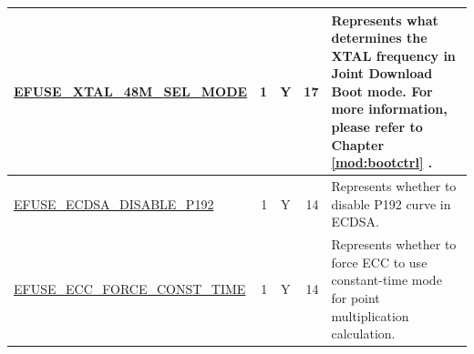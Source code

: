 \begin{longtable}[l]{ |m{8.2cm}|r|c|r|m{9cm}| }
    \hline
    \hyperref[fielddesc:EFUSEXTAL48MSELMODE]{EFUSE\_XTAL\_48M\_SEL\_MODE} &  1 & Y & 17 & Represents what determines the XTAL frequency in \textbf{Joint Download Boot} mode.  For more information, please refer to Chapter \ref{mod:bootctrl} \textit{\nameref{mod:bootctrl}}.\\
    \hline
    \hyperref[fielddesc:EFUSEECDSADISABLEP192]{EFUSE\_ECDSA\_DISABLE\_P192} &  1 & Y & 14 & Represents whether to disable P192 curve in ECDSA.\\
    \hline
    \hyperref[fielddesc:EFUSEECCFORCECONSTTIME]{EFUSE\_ECC\_FORCE\_CONST\_TIME} &  1 & Y & 14 & Represents whether to force ECC to use constant-time mode for point multiplication calculation.\\
    \hline
\end{longtable}
